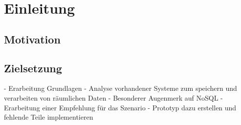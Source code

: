 \chapter{Einleitung}


\section{Motivation}




\section{Zielsetzung}
- Erarbeitung Grundlagen
- Analyse vorhandener Systeme zum speichern und verarbeiten von räumlichen Daten
- Besonderer Augenmerk auf NoSQL
- Erarbeitung einer Empfehlung für das Szenario
- Prototyp dazu erstellen und fehlende Teile implementieren
